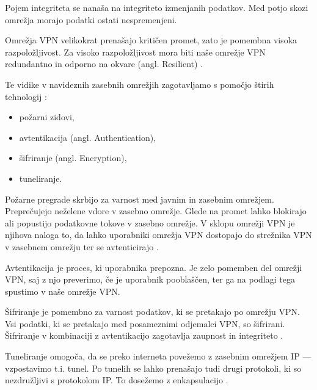 \documentclass[a4paper, 12pt]{book}
\begin{document}
Pojem integriteta se nanaša na integriteto izmenjanih podatkov. Med potjo skozi omrežja morajo podatki ostati nespremenjeni.

Omrežja VPN velikokrat prenašajo kritičen promet, zato je pomembna visoka razpoložljivost. Za visoko razpoložljivost mora biti naše omrežje VPN redundantno in odporno na okvare (angl. Resilient) \cite{muniz_ccnp_2021}.

Te vidike v navideznih zasebnih omrežjih zagotavljamo s pomočjo štirih tehnologij \cite{scott_virtual_1999}:
\begin{itemize}
    \setlength\itemsep{0em}
    \item požarni zidovi,
    \item avtentikacija (angl. Authentication),
    \item šifriranje (angl. Encryption),
    \item tuneliranje.

\end{itemize}
Požarne pregrade skrbijo za varnost med javnim in zasebnim omrežjem. Preprečujejo neželene vdore v zasebno omrežje. Glede na promet lahko blokirajo ali popustijo podatkovne tokove v zasebno omrežje. V sklopu omrežji VPN je njihova naloga to, da lahko uporabniki omrežja VPN dostopajo do strežnika VPN v zasebnem omrežju ter se avtenticirajo \cite{scott_virtual_1999}.

Avtentikacija je proces, ki uporabnika prepozna. Je zelo pomemben del omrežji VPN, saj z njo preverimo, če je uporabnik pooblaščen, ter ga na podlagi tega spustimo v naše omrežje VPN.

Šifriranje je pomembno za varnost podatkov, ki se pretakajo po omrežju VPN. Vsi podatki, ki se pretakajo med posameznimi odjemalci VPN, so šifrirani. Šifriranje v kombinaciji z avtentikacijo zagotavlja zaupnost in integriteto \cite{scott_virtual_1999}. %

Tuneliranje omogoča, da se preko interneta povežemo z zasebnim omrežjem IP --- vzpostavimo t.i. tunel. Po tunelih se lahko prenašajo tudi drugi protokoli, ki so nezdružljivi s protokolom IP. To dosežemo z enkapsulacijo \cite{scott_virtual_1999}.


\end{document}

